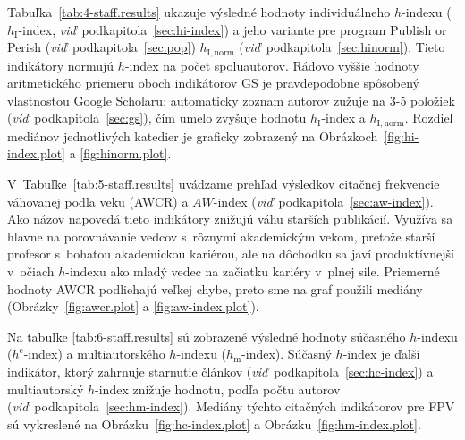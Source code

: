Tabuľka~\ref{tab:4-staff.results} ukazuje výsledné hodnoty individuálneho
$h$-indexu ($h_{\mathrm{I}}$-index, \emph{viď}~podkapitola~\ref{sec:hi-index}) a
jeho variante pre program Publish or Perish
(\emph{viď}~podkapitola~\ref{sec:pop}) $h_{\mathrm{I,norm}}$
(\emph{viď}~podkapitola~\ref{sec:hinorm}).  Tieto indikátory normujú $h$-index
na počet spoluautorov.  Rádovo vyššie hodnoty aritmetického priemeru oboch
indikátorov GS je pravdepodobne spôsobený vlastnosťou Google Scholaru:
automaticky zoznam autorov zužuje na 3-5 položiek
(\emph{viď}~podkapitola~\ref{sec:gs}), čím umelo zvyšuje hodnotu
$h_{\mathrm{I}}$-index a $h_{\mathrm{I,norm}}$.  Rozdiel mediánov jednotlivých
katedier je graficky zobrazený na Obrázkoch~\ref{fig:hi-index.plot} a
\ref{fig:hinorm.plot}.

V~Tabuľke~\ref{tab:5-staff.results} uvádzame prehľad výsledkov citačnej
frekvencie váhovanej podľa veku (AWCR) a $AW$-index
(\emph{viď}~podkapitola~\ref{sec:aw-index}).  Ako názov napovedá tieto
indikátory znižujú váhu starších publikácií.  Využíva sa hlavne na porovnávanie
vedcov s~rôznymi akademickým vekom, pretože starší profesor s~bohatou
akademickou kariérou, ale na dôchodku sa javí produktívnejší v~očiach $h$-indexu
ako mladý vedec na začiatku kariéry v~plnej sile.  Priemerné hodnoty AWCR
podliehajú veľkej chybe, preto sme na graf použili mediány
(Obrázky~\ref{fig:awcr.plot} a \ref{fig:aw-index.plot}).

Na tabuľke \ref{tab:6-staff.results} sú zobrazené výsledné hodnoty súčasného
$h$-indexu ($h^{\mathrm{c}}$-index) a multiautorského $h$-indexu
($h_{\mathrm{m}}$-index).  Súčasný $h$-index je ďalší indikátor, ktorý zahrnuje
starnutie článkov (\emph{viď}~podkapitola~\ref{sec:hc-index}) a multiautorský
$h$-index znižuje hodnotu, podľa počtu autorov
(\emph{viď}~podkapitola~\ref{sec:hm-index}).  Mediány týchto citačných
indikátorov pre FPV sú vykreslené na Obrázku~\ref{fig:hc-index.plot} a
Obrázku~\ref{fig:hm-index.plot}.

